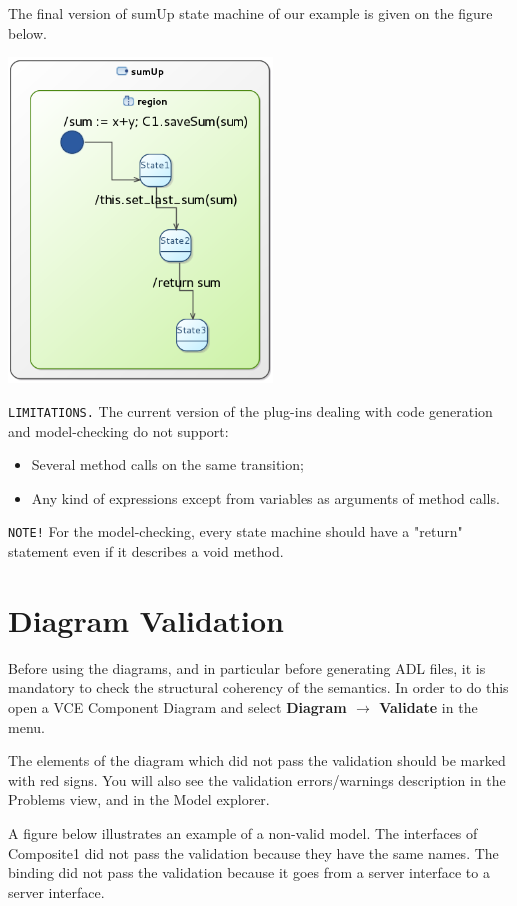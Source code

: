 \documentclass[12pt]{article}
\begin{document}
The final version of sumUp state machine of our example is given on the figure below.

     \centerline{
     \includegraphics[width=7cm]{draws/sm.png}
     \label{fig:vce-proj}
     }

\texttt{LIMITATIONS.} The current version of the plug-ins dealing with code generation and model-checking do not support:

\begin{itemize}
\item
Several method calls on the same transition;
\item
Any kind of expressions except from variables as arguments of method calls.
\end{itemize}

\texttt{NOTE!} For the model-checking, every state machine should have a "return" statement even if it describes a void method.

\section{Diagram Validation}
Before using the diagrams, and in particular before generating ADL files, it is mandatory to check the structural coherency of the semantics. In order to do this open a VCE Component Diagram and select \textbf{Diagram $\rightarrow$ Validate} in the menu. 

The elements of the diagram which did not pass the validation should be marked with red signs. You will also see the validation errors/warnings description in the Problems view, and in the Model explorer.

A figure below illustrates an example of a non-valid model. The interfaces of Composite1 did not pass the validation because they have the same names. The binding did not pass the validation because it goes from a server interface to a server interface.
\end{document}
